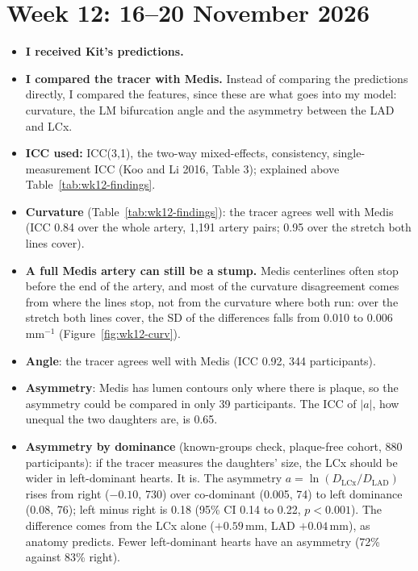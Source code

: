 \documentclass[11pt,a4paper]{article}
\begin{document}

\section*{Week 12: 16--20 November 2026}

\sectionprogress

\begin{itemize}[itemsep=2pt]
  \item \textbf{I received Kit's predictions.}
  \item \textbf{I compared the tracer with Medis.} Instead of comparing the predictions directly, I compared the
    features, since these are what goes into my model: curvature, the LM bifurcation angle and the asymmetry
    between the LAD and LCx.
  \item \textbf{ICC used:} ICC(3,1), the two-way mixed-effects, consistency, single-measurement ICC (Koo and Li
    2016, Table 3); explained above Table~\ref{tab:wk12-findings}.
  \item \textbf{Curvature} (Table~\ref{tab:wk12-findings}): the tracer agrees well with Medis (ICC 0.84 over the
    whole artery, 1,191 artery pairs; 0.95 over the stretch both lines cover).
  \item \textbf{A full Medis artery can still be a stump.} Medis centerlines often stop before the end of the
    artery, and most of the curvature disagreement comes from where the lines stop, not from the curvature where
    both run: over the stretch both lines cover, the SD of the differences falls from 0.010 to 0.006\,mm$^{-1}$
    (Figure~\ref{fig:wk12-curv}).
  \item \textbf{Angle}: the tracer agrees well with Medis (ICC 0.92, 344 participants).
  \item \textbf{Asymmetry}: Medis has lumen contours only where there is plaque, so the asymmetry could be
    compared in only 39 participants. The ICC of $|a|$, how unequal the two daughters are,
    is 0.65.
  \item \textbf{Asymmetry by dominance} (known-groups check, plaque-free cohort, 880 participants): if the tracer
    measures the daughters' size, the LCx should be wider in left-dominant hearts. It is. The asymmetry
    $a = \ln(D_\text{LCx}/D_\text{LAD})$ rises from right ($-0.10$, 730) over co-dominant (0.005, 74) to left
    dominance (0.08, 76); left minus right is 0.18 (95\% CI 0.14 to 0.22, $p < 0.001$). The difference comes from
    the LCx alone ($+0.59$\,mm, LAD $+0.04$\,mm), as anatomy predicts. Fewer left-dominant hearts have an asymmetry
    (72\% against 83\% right).
\end{itemize}
\end{document}
